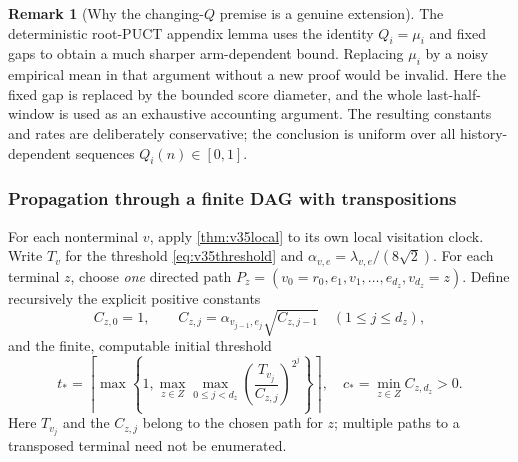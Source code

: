 \documentclass{article}
\theoremstyle{plain}
\theoremstyle{definition}
\newtheorem{remark}[theorem]{Remark}
\begin{document}
\begin{remark}[Why the changing-$Q$ premise is a genuine extension]
\label{rem:v35noy}
The deterministic root-PUCT appendix lemma uses the identity
$Q_i=\mu_i$ and fixed gaps to obtain a much sharper arm-dependent
bound. Replacing $\mu_i$ by a noisy empirical mean in that argument
without a new proof would be invalid. Here the fixed gap is replaced
by the bounded score diameter, and the whole last-half-window is used
as an exhaustive accounting argument. The resulting constants and
rates are deliberately conservative; the conclusion is uniform over
all history-dependent sequences $Q_i(n)\in[0,1]$.
\end{remark}

\subsubsection{Propagation through a finite DAG with transpositions}
\label{sec:v35dag}
For each nonterminal $v$, apply \cref{thm:v35local} to its own local
visitation clock. Write $T_v$ for the threshold
\eqref{eq:v35threshold} and
$\alpha_{v,e}=\lambda_{v,e}/(8\sqrt2)$.
For each terminal $z$, choose \emph{one} directed path
$P_z=(v_0=r_0,e_1,v_1,\ldots,e_{d_z},v_{d_z}=z)$.
Define recursively the explicit positive constants
\begin{equation}
 C_{z,0}=1,
 \qquad C_{z,j}=\alpha_{v_{j-1},e_j}\sqrt{C_{z,j-1}}
 \quad(1\le j\le d_z),
 \label{eq:v35constants}
\end{equation}
and the finite, computable initial threshold
\begin{equation}
 t_*=\left\lceil\max\left\{1,
 \max_{z\in Z}\max_{0\le j<d_z}
 \left(\frac{T_{v_j}}{C_{z,j}}\right)^{2^j}
 \right\}\right\rceil,
 \quad
 c_*=\min_{z\in Z} C_{z,d_z}>0.
 \label{eq:v35tstar}
\end{equation}
Here $T_{v_j}$ and the $C_{z,j}$ belong to the chosen path for $z$;
multiple paths to a transposed terminal need not be enumerated.
\end{document}
